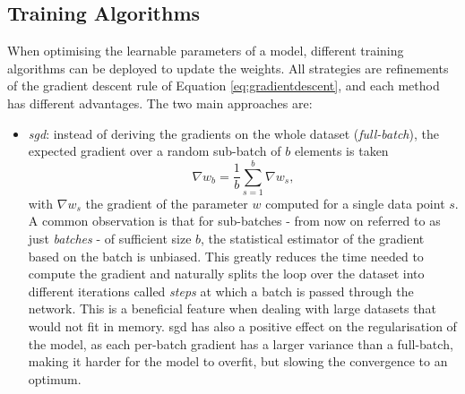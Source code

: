 \subsection{Training Algorithms}
When optimising the learnable parameters of a model, different training algorithms can be deployed to update the weights. All strategies are refinements of the gradient descent rule of Equation \ref{eq:gradientdescent}, and each method has different advantages. The two main approaches are: 
\begin{itemize}[leftmargin=*]
    \item \textit{\gls{sgd}}: instead of deriving the gradients on the whole dataset (\textit{full-batch}), the expected gradient over a random sub-batch of $b$ elements is taken \[ \nabla w_b = \frac{1}{b} \sum_{s=1}^b \nabla w_s,\] with $\nabla w_s$ the gradient of the parameter $w$ computed for a single data point $s$. A common observation is that for sub-batches - from now on referred to as just \textit{batches} - of sufficient size $b$, the statistical estimator of the gradient based on the batch is unbiased. This greatly reduces the time needed to compute the gradient and naturally splits the loop over the dataset into different iterations called \textit{steps} at which a batch is passed through the network. This is a beneficial feature when dealing with large datasets that would not fit in memory. \gls{sgd} has also a positive effect on the regularisation of the model, as each per-batch gradient has a larger variance than a full-batch, making it harder for the model to overfit, but slowing the convergence to an optimum. 

\end{itemize}
